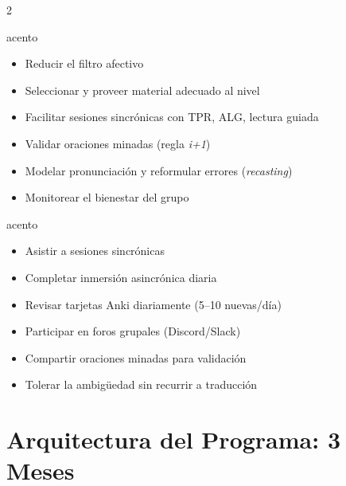 \documentclass[12pt,a4paper]{article}
\begin{document}
\begin{multicols}{2}

\begin{cajames}{acento}
\begin{itemize}[leftmargin=0.8cm]
  \item Reducir el filtro afectivo
  \item Seleccionar y proveer material adecuado al nivel
  \item Facilitar sesiones sincrónicas con TPR, ALG, lectura guiada
  \item Validar oraciones minadas (regla \textit{i+1})
  \item Modelar pronunciación y reformular errores (\textit{recasting})
  \item Monitorear el bienestar del grupo
\end{itemize}
\end{cajames}

\columnbreak

\begin{cajames}{acento}
\begin{itemize}[leftmargin=0.8cm]
  \item Asistir a sesiones sincrónicas
  \item Completar inmersión asincrónica diaria
  \item Revisar tarjetas Anki diariamente (5--10 nuevas/día)
  \item Participar en foros grupales (Discord/Slack)
  \item Compartir oraciones minadas para validación
  \item Tolerar la ambigüedad sin recurrir a traducción
\end{itemize}
\end{cajames}

\end{multicols}

\section*{Arquitectura del Programa: 3 Meses}
\end{document}
